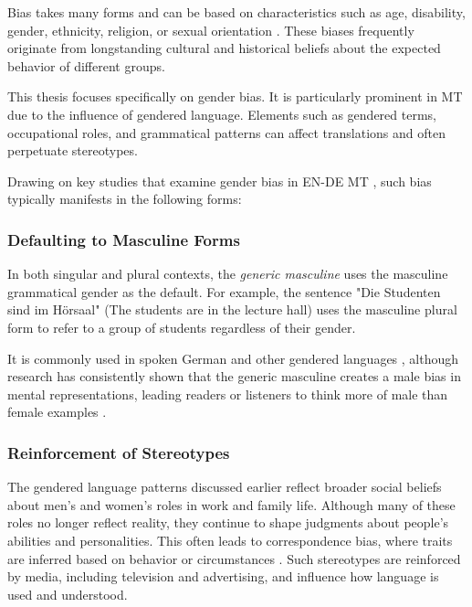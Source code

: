     Bias takes many forms and can be based on characteristics such as age, disability, gender, ethnicity, religion, or sexual orientation \parencite{ullmannGenderBiasMachine2022}. These biases frequently originate from longstanding cultural and historical beliefs about the expected behavior of different groups.

    This thesis focuses specifically on gender bias. It is particularly prominent in MT due to the influence of gendered language. Elements such as gendered terms, occupational roles, and grammatical patterns can affect translations and often perpetuate stereotypes.
    
    Drawing on key studies that examine gender bias in EN-DE MT \parencite{ullmannGenderBiasMachine2022,rescignoGenderBiasMachine2023,lardelliBuildingBridgesDataset2024,kapplAreAllSpanish2025}, such bias typically manifests in the following forms:

    \subsubsection{Defaulting to Masculine Forms}
        In both singular and plural contexts, the \textit{generic masculine} uses the masculine grammatical gender as the default.
        For example, the sentence "Die Studenten sind im Hörsaal" (The students are in the lecture hall) uses the masculine plural form to refer to a group of students regardless of their gender.

        It is commonly used in spoken German and other gendered languages \parencite{lardelliBuildingBridgesDataset2024,schmitzGermanAllProfessors2022}, although research has consistently shown that the generic masculine creates a male bias in mental representations, leading readers or listeners to think more of male than female examples \parencite{sczesnyCanGenderFairLanguage2016}. 

    \subsubsection{Reinforcement of Stereotypes}
        The gendered language patterns discussed earlier reflect broader social beliefs about men’s and women’s roles in work and family life. Although many of these roles no longer reflect reality, they continue to shape judgments about people’s abilities and personalities. This often leads to correspondence bias, where traits are inferred based on behavior or circumstances \parencite{godsilEffectsGenderRoles2016}. Such stereotypes are reinforced by media, including television and advertising, and influence how language is used and understood.

